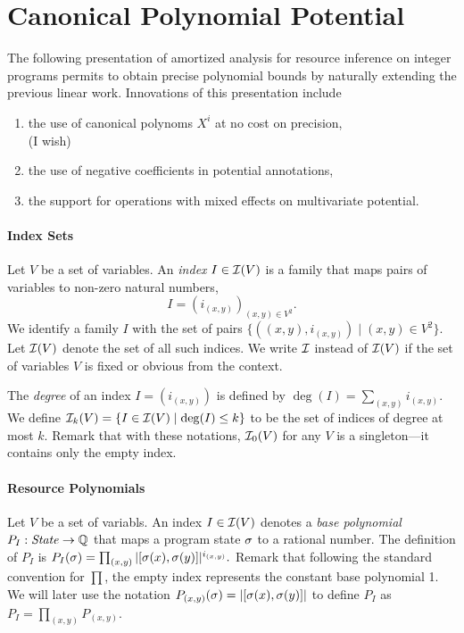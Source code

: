 \documentclass[nocopyrightspace,preprint]{sigplanconf-pldi15}
\begin{document}
\section{Canonical Polynomial Potential}

The following presentation of amortized analysis for resource
inference on integer programs permits to obtain precise polynomial
bounds by naturally extending the previous linear work. Innovations
of this presentation include
\begin{enumerate}
\item the use of canonical polynoms $X^i$ at no cost on precision,
 \\ (I wish)
\item the use of negative coefficients in potential annotations,
\item the support for operations with mixed effects on multivariate potential.
\end{enumerate}

\paragraph{Index Sets}

Let $V$ be a set of variables.  An \emph{index} $I \in \mathcal{I}(V)$ is a
family that maps pairs of variables to non-zero natural numbers,
$$
I = (i_{(x,y)})_{(x,y) \in V^2} .
$$
%
We identify a family $I$ with the set of pairs $\{ ((x,y),i_{(x,y)})
\mid (x,y) \in V^2\}$.
Let $\mathcal{I}(V)$ denote the set of all such indices.  We write $\mathcal{I}$
instead of $\mathcal{I}(V)$ if the set of variables $V$ is fixed or obvious
from the context.
%

The \emph{degree} of an index $I = (i_{(x,y)})$
is defined by
$
\deg(I) = \sum_{(x,y)} i_{(x,y)}.
$
We define $\mathcal{I}_k(V) = \{ I \in \mathcal{I}(V) \mid \deg(I) \leq k
\}$ to be the set of indices of degree at most $k$.  Remark
that with these notations, $\mathcal{I}_0(V)$ for any $V$ is a
singleton---it contains only the empty index.

\paragraph{Resource Polynomials}

Let $V$ be a set of variabls.  An index $I \in \mathcal{I}(V)$ denotes a
\emph{base polynomial} $P_I : \mathit{State} \to \mathbb{Q}$ that maps a program
state $\sigma$ to a rational number.  The definition of $P_I$ is
$
P_I(\sigma) = \prod_{(x,y)} |[\sigma(x),\sigma(y)]|^{i_{(x,y)}}.
$
Remark that following the standard convention for $\prod$, the
empty index represents the constant base polynomial 1.  We will
later use the notation $P_{(x,y)}(\sigma) = |[\sigma(x),\sigma(y)]|$
to define $P_I$ as $P_I = \prod_{(x,y)} P_{(x,y)}$.
\end{document}
